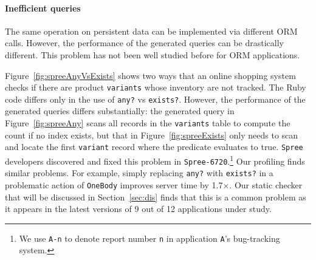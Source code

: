 \paragraph{\bf{Inefficient queries}}
The same operation on persistent data can be implemented via different ORM calls. However, the performance of the generated queries can be drastically different. This problem has not been well studied before for ORM applications.

Figure~\ref{fig:spreeAnyVsExists} shows two ways that an online shopping system checks if there are product \texttt{variants} whose inventory are not tracked.
The Ruby code differs only in the use of 
\texttt{any?} vs \texttt{exists?}. However, the performance of the generated queries differs substantially:
the generated query in Figure~\ref{fig:spreeAny} scans all records in the \texttt{variants} table to compute the count if no index exists, but that in Figure~\ref{fig:spreeExists} only needs to scan and locate the first 
\texttt{variant} record where the predicate evaluates to true. \texttt{Spree} developers discovered and fixed this problem in 
\texttt{Spree-6720}.\footnote{We use \texttt{A-n} to denote report number {\tt n} in application {\tt A}'s bug-tracking system.}
Our profiling finds similar problems. For example, simply replacing \texttt{any?} with \texttt{exists?} in a problematic action of \texttt{OneBody} improves server time by 1.7$\times$. 
Our static checker that will be discussed in Section~\ref{sec:dis} finds that this is a common problem as it appears in the latest versions of 9 out of 12 applications under study.

